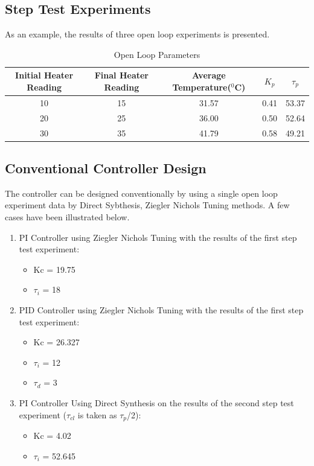 \subsection{Step Test Experiments}
As an example, the results of three open loop experiments is presented.


\begin{table}[h]
	\begin{tabular}{|c|c|c|c|c|}\hline
	Initial Heater Reading&Final Heater Reading&Average Temperature($^0$C)&$K_p$&$\tau_p$\\ \hline \hline
	10	&15	&31.57	&0.41	&53.37\\ \hline
	20	&25	&36.00	&0.50	&52.64\\ \hline
	30	&35	&41.79	&0.58	&49.21\\ \hline
		
	\end{tabular}
	\caption{Open Loop Parameters}
	\label{tab:OpenLoopParameters}
\end{table}


\subsection{Conventional Controller Design}
The controller can be designed conventionally by using a single open loop experiment data by Direct Sybthesis, Ziegler Nichols Tuning methods. A few cases have been illustrated below.
\begin{enumerate}
	\item PI Controller using Ziegler Nichols Tuning with the results of the first step test experiment: 
\begin{itemize}
	\item Kc  = 19.75 
	\item $\tau_i$ = 18

\end{itemize}


	\item PID Controller using Ziegler Nichols Tuning with the results of the first step test experiment: 
\begin{itemize}
	\item Kc  = 26.327 
	\item $\tau_i$ = 12
	\item $\tau_d$ = 3

\end{itemize}


	\item PI Controller Using Direct Synthesis on the results of the second step test experiment ($\tau_{cl}$ is taken as $\tau_p$/2):
\begin{itemize}
	\item Kc  = 4.02
	\item $\tau_i$ = 52.645

\end{itemize}


\end{enumerate}
